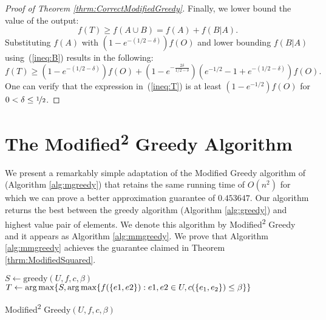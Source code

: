 \documentclass[a4paper,UKenglish,cleveref, autoref]{lipics-v2019}
\begin{document}
\begin{proof}[Proof of Theorem \ref{thrm:CorrectModifiedGreedy}]
	Finally, we lower bound the value of the output:
	\begin{equation}
		f(T) \geq f(A \cup B) = f(A) + f(B | A).
	\end{equation}	
	Substituting $f(A)$ with $(1 - e^{-(1/2 - \delta)})f(O)$ and lower bounding $f(B|A)$ using~(\ref{ineq:B}) results in the following:
	\begin{equation}
		\label{ineq:T}
		f(T) \geq (1 - e^{-(1/2 - \delta)})f(O) + (1 - e^{-\frac{2\delta}{1/2 - \delta}})(e^{-1/2} - 1 + e^{-(1/2 - \delta)})f(O).
	\end{equation}
	One can verify that the expression in~(\ref{ineq:T}) is at least $(1-e^{-1/2})f(O)$ for $0 < \delta \leq \nicefrac[]{1}{2}$.
\end{proof}



\section{The Modified\textsuperscript{2} Greedy Algorithm}\label{sec:Modified2Greedy}
We present a remarkably simple adaptation of the Modified Greedy algorithm of \cite{khuller1999budgeted} (Algorithm \ref{alg:mgreedy}) that retains the same running time of $O(n^2)$ for which we can prove a better approximation guarantee of $0.453647$.
Our algorithm returns the best between the greedy algorithm (Algorithm \ref{alg:greedy}) and highest value pair of elements.
We denote this algorithm by Modified\textsuperscript{2} Greedy and it appears as Algorithm \ref{alg:mmgreedy}.
We prove that Algorithm \ref{alg:mmgreedy} achieves the guarantee claimed in Theorem \ref{thrm:ModifiedSquared}.




\begin{algorithm}
	$S \leftarrow \text{greedy}(U, f, c, \beta)$
	\\
	$T \leftarrow \arg\max\{S, \operatorname*{arg\,max} \{ f(\{ e1,e2\}):e1,e2\in U, c(\{e_1, e_2\} ) \leq \beta \} \}$
	\\
	\caption{Modified\textsuperscript{2} Greedy$(U, f, c, \beta)$}
	\label{alg:mmgreedy}
\end{algorithm}
\end{document}
